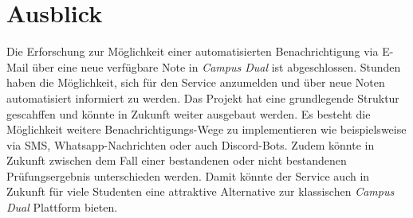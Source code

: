 \chapter{Ausblick}
Die Erforschung zur Möglichkeit einer automatisierten Benachrichtigung via E-Mail über eine neue verfügbare Note in \textit{Campus Dual} ist abgeschlossen.
Stunden haben die Möglichkeit, sich für den Service anzumelden und über neue Noten automatisiert informiert zu werden.
Das Projekt hat eine grundlegende Struktur gescahffen und könnte in Zukunft weiter ausgebaut werden.
Es besteht die Möglichkeit weitere Benachrichtigungs-Wege zu implementieren wie beispielsweise via SMS, Whatsapp-Nachrichten oder auch Discord-Bots.
Zudem könnte in Zukunft zwischen dem Fall einer bestandenen oder nicht bestandenen Prüfungsergebnis unterschieden werden.
Damit könnte der Service auch in Zukunft für viele Studenten eine attraktive Alternative zur klassischen \textit{Campus Dual} Plattform bieten.

